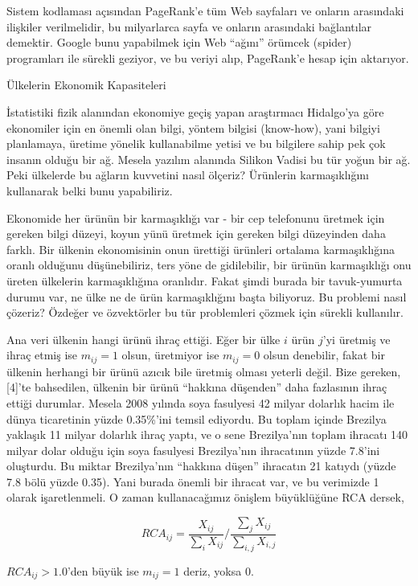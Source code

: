 \documentclass[12pt,fleqn]{article}\usepackage{../../common}
\begin{document}
Sistem kodlaması açısından PageRank'e tüm Web sayfaları ve onların
arasındaki ilişkiler verilmelidir, bu milyarlarca sayfa ve onların
arasındaki bağlantılar demektir. Google bunu yapabilmek için Web ``ağını''
örümcek (spider) programları ile sürekli geziyor, ve bu veriyi alıp,
PageRank'e hesap için aktarıyor.

Ülkelerin Ekonomik Kapasiteleri

İstatistiki fizik alanından ekonomiye geçiş yapan araştırmacı Hidalgo'ya
göre ekonomiler için en önemli olan bilgi, yöntem bilgisi (know-how), yani
bilgiyi planlamaya, üretime yönelik kullanabilme yetisi ve bu bilgilere
sahip pek çok insanın olduğu bir ağ. Mesela yazılım alanında Silikon Vadisi
bu tür yoğun bir ağ. Peki ülkelerde bu ağların kuvvetini nasıl ölçeriz?
Ürünlerin karmaşıklığını kullanarak belki bunu yapabiliriz. 

Ekonomide her ürünün bir karmaşıklığı var - bir cep telefonunu üretmek için
gereken bilgi düzeyi, koyun yünü üretmek için gereken bilgi düzeyinden daha
farklı. Bir ülkenin ekonomisinin onun ürettiği ürünleri ortalama
karmaşıklığına oranlı olduğunu düşünebiliriz, ters yöne de gidilebilir, bir
ürünün karmaşıklığı onu üreten ülkelerin karmaşıklığına oranlıdır. Fakat
şimdi burada bir tavuk-yumurta durumu var, ne ülke ne de ürün
karmaşıklığını başta biliyoruz. Bu problemi nasıl çözeriz? Özdeğer ve
özvektörler bu tür problemleri çözmek için sürekli kullanılır.

Ana veri ülkenin hangi ürünü ihraç ettiği. Eğer bir ülke $i$ ürün $j$'yi
üretmiş ve ihraç etmiş ise $m_{ij}=1$ olsun, üretmiyor ise $m_{ij}=0$ olsun
denebilir, fakat bir ülkenin herhangi bir ürünü azıcık bile üretmiş olması
yeterli değil. Bize gereken, [4]'te bahsedilen, ülkenin bir ürünü ``hakkına
düşenden'' daha fazlasının ihraç ettiği durumlar. Mesela 2008 yılında soya
fasulyesi 42 milyar dolarlık hacim ile dünya ticaretinin yüzde 0.35\%'ini
temsil ediyordu. Bu toplam içinde Brezilya yaklaşık 11 milyar dolarlık
ihraç yaptı, ve o sene Brezilya'nın toplam ihracatı 140 milyar dolar olduğu
için soya fasulyesi Brezilya'nın ihracatının yüzde 7.8'ini oluşturdu. Bu
miktar Brezilya'nın ``hakkına düşen'' ihracatın 21 katıydı (yüzde 7.8 bölü
yüzde 0.35). Yani burada önemli bir ihracat var, ve bu verimizde 1 olarak
işaretlenmeli. O zaman kullanacağımız önişlem büyüklüğüne RCA dersek,

$$
RCA_{ij} = \frac{X_{ij}}{\sum_i X_{ij}} / \frac{\sum_j X_{ij}}{\sum_{i,j} X_{i,j}}
$$

$RCA_{ij} > 1.0$'den büyük ise $m_{ij}=1$ deriz, yoksa 0. 
\end{document}
